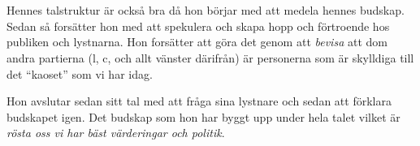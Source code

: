 \documentclass[12pt, letterpaper]{article}
\begin{document}
    \section{}

    Hennes talstruktur är också bra då hon börjar med att medela hennes budskap. Sedan så forsätter hon med att spekulera och skapa hopp och förtroende hos publiken och lystnarna. Hon forsätter att göra det genom att \textit{bevisa} att dom andra partierna (l, c, och allt vänster därifrån) är personerna som är skylldiga till det ``kaoset'' som vi har idag. 

    Hon avslutar sedan sitt tal med att fråga sina lystnare och sedan att förklara budskapet igen. Det budskap som hon har byggt upp under hela talet vilket är \textit{rösta oss vi har bäst värderingar och politik}.
\end{document}

